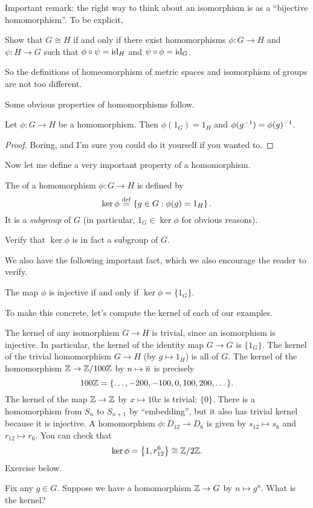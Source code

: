 Important remark:
the right way to think about an isomorphism is as a ``bijective homomorphism''.
To be explicit,
\begin{exercise}
	Show that $G \cong H$ if and only if there exist
	homomorphisms $\phi : G \to H$ and $\psi : H \to G$
	such that $\phi \circ \psi = \mathrm{id}_H$ and $\psi \circ \phi = \mathrm{id}_G$.
\end{exercise}
So the definitions of homeomorphism of metric spaces
and isomorphism of groups are not too different.

Some obvious properties of homomorphisms follow.
\begin{fact}
	Let $\phi : G \to H$ be a homomorphism.
	Then $\phi(1_G) = 1_H$ and $\phi(g^{-1}) = \phi(g)^{-1}$.
\end{fact}
\begin{proof}
	Boring, and I'm sure you could do it yourself if you wanted to.
\end{proof}

Now let me define a very important property of a homomorphism.
\begin{definition}
	The  of a homomorphism $\phi : G \to H$ is defined by
	\[ \ker \phi 
	\overset{\mathrm{def}}{=}
		\left\{ g \in G : \phi(g) = 1_H \right\}.
		\]
	It is a \emph{subgroup} of $G$ (in particular, $1_G \in \ker \phi$ for obvious reasons).
\end{definition}
\begin{ques}
	Verify that $\ker\phi$ is in fact a subgroup of $G$.
\end{ques}
We also have the following important fact, which we also encourage the reader to verify.
\begin{proposition}
	The map $\phi$ is injective if and only if $\ker\phi = \{1_G\}$.
\end{proposition}

To make this concrete, let's compute the kernel of each of our examples.
\begin{example}
	\listhack
	\begin{enumerate}[(a)]
		\ii The kernel of any isomorphism $G \to H$ is trivial,
		since an isomorphism is injective.
		In particular, the kernel of the identity map $G \to G$ is $\{1_G\}$.
		\ii The kernel of the trivial homomorphism $G \to H$ (by $g \mapsto 1_H$) is all of $G$.
		\ii The kernel of the homomorphism $\mathbb Z \to \mathbb Z/100\mathbb Z$ by $n \mapsto \overline n$
		is precisely \[ 100\mathbb Z = \{\dots, -200, -100, 0, 100, 200, \dots \}. \]
		\ii The kernel of the map $\mathbb Z \to \mathbb Z$ by $x \mapsto 10x$ is trivial: $\{0\}$.
		\ii There is a homomorphism from $S_n$ to $S_{n+1}$ by ``embedding'',
		but it also has trivial kernel because it is injective.
		\ii A homomorphism $\phi: D_{12} \to D_6$ is given by $s_{12} \mapsto s_6$ and $r_{12} \mapsto r_6$.  
		You can check that
		\[ \ker \phi = \left\{ 1, r_{12}^{6} \right\} \cong \mathbb Z/2\mathbb Z. \]
		\ii Exercise below.
	\end{enumerate}
\end{example}
\begin{exercise}
	Fix any $g \in G$.
	Suppose we have a homomorphism $\mathbb Z \to G$ by $n \mapsto g^n$.
	What is the kernel?
\end{exercise}

